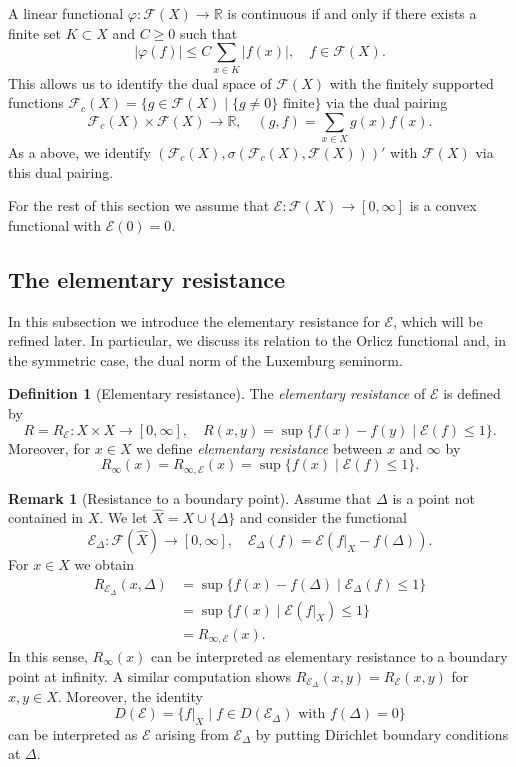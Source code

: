 \documentclass[a4paper,11pt,reqno]{amsart}
\theoremstyle{definition}
\newtheorem{definition}[lemma]{Definition}
\newtheorem{remark}[lemma]{Remark}
\numberwithin{equation}{section}
\newcommand{\cE}{{\mathcal E}}
\newcommand{\cF}{{\mathcal F}}
\newcommand{\R}{{\mathbb R}}
\newcommand{\1}{\mathds{1}}
\begin{document}
A linear functional  $\varphi \colon \cF(X) \to \R$ is continuous if and only if there exists a finite set $K \subset X$ and $C \geq 0$ such that 
%
$$|\varphi(f)| \leq C \sum_{x \in K} |f(x)|, \quad f \in \cF(X).$$
%
This allows us to identify the dual space of $\cF(X)$ with the finitely supported functions $\cF_c(X) = \{g \in \cF(X) \mid \{g \neq 0\} \text{ finite}\}$ via the dual pairing 
%
$$\cF_c(X) \times \cF(X) \to \R,\quad (g,f) = \sum_{x \in X} g(x) f(x).$$
%
As a above, we identify $(\cF_c(X),\sigma(\cF_c(X),\cF(X)))'$ with $\cF(X)$ via this dual pairing. 

For the rest of this section we assume that $\cE \colon \cF(X) \to [0,\infty]$ is a convex functional with $\cE(0) = 0$. 


\subsection{The elementary resistance}

In this subsection we introduce the elementary resistance for $\cE$, which will be refined later. In particular, we discuss its relation to the Orlicz functional and, in the symmetric case, the dual norm of the Luxemburg seminorm. 


\begin{definition}[Elementary resistance] \label{definition:elementary resistance}
The {\em elementary resistance} of $\cE$ is defined by
%
$$ R = R_\cE \colon X \times X \to [0,\infty], \quad R(x,y) = \sup \{f(x) - f(y) \mid  \cE(f) \leq 1\}.$$
%
Moreover, for $x \in X$ we define  {\em elementary resistance} between $x$ and $\infty$ by  
%
$$R_\infty(x) = R_{\infty,\cE}(x)  =  \sup \{f(x) \mid  \cE(f) \leq 1\}.$$
\end{definition}


\begin{remark}[Resistance to a boundary point]\label{remark:resistance to boundary point}
 Assume that $\Delta$ is a point  not contained in $X$. We let $\hat X = X \cup \{\Delta\}$ and consider the functional 
%
$$\cE_\Delta \colon \cF(\hat X) \to [0,\infty],\quad \cE_\Delta(f) = \cE(f|_X - f(\Delta)).$$
%
For $x \in X$ we obtain 
%
\begin{align*}
R_{\cE_\Delta}(x,\Delta) &= \sup \{f(x) - f(\Delta) \mid \cE_\Delta(f) \leq 1\} \\
&= \sup \{f(x) \mid \cE(f|_X) \leq 1\}\\
&= R_{\infty,\cE}(x).
\end{align*}
%
In this sense, $R_\infty(x)$ can be interpreted as elementary resistance to a boundary point at infinity. A similar computation shows $R_{\cE_\Delta}(x,y) = R_\cE(x,y)$ for $x,y \in X$. Moreover, the identity
%
$$D(\cE) = \{f|_X \mid f \in D(\cE_\Delta) \text{ with }f(\Delta) =  0\}$$
%
can be interpreted as $\cE$ arising from $\cE_\Delta$ by putting Dirichlet boundary conditions at $\Delta$. 
\end{remark}
\end{document}
